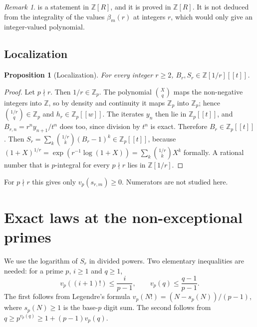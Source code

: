 \documentclass[11pt,reqno]{amsart}
\newtheorem{proposition}[theorem]{Proposition}
\theoremstyle{definition}
\theoremstyle{remark}
\newtheorem{remark}[theorem]{Remark}
\theoremstyle{plain}
\newcommand{\Z}{\mathbb Z}
\begin{document}
\begin{remark}
 is a statement in $\Z[R]$, and it is proved in $\Z[R]$. It is not deduced from the integrality of the values $\beta_m(r)$ at integers $r$, which would only give an integer-valued polynomial.
\end{remark}

\subsection{Localization}

\begin{proposition}[Localization]\label{prop:localization}
For every integer $r\ge2$, $B_r,S_r\in\Z[1/r][[t]]$.
\end{proposition}

\begin{proof}
Let $p\nmid r$. Then $1/r\in\Z_p$. The polynomial $\binom Xq$ maps the non-negative integers into $\Z$, so by density and continuity it maps $\Z_p$ into $\Z_p$; hence $\binom{1/r}q\in\Z_p$ and $h_r\in\Z_p[[w]]$. The iterates $y_n$ then lie in $\Z_p[[t]]$, and $B_{r,n}=r^ny_{n+1}/t^n$ does too, since division by $t^n$ is exact. Therefore $B_r\in\Z_p[[t]]$. Then $S_r=\sum_k\binom{1/r}{k}(B_r-1)^k\in\Z_p[[t]]$, because $(1+X)^{1/r}=\exp(r^{-1}\log(1+X))=\sum_k\binom{1/r}kX^k$ formally. A rational number that is $p$-integral for every $p\nmid r$ lies in $\Z[1/r]$.
\end{proof}

For $p\nmid r$ this gives only $v_p(s_{r,m})\ge0$. Numerators are not studied here.

\section{Exact laws at the non-exceptional primes}\label{sec:nonexc}

We use the logarithm of $S_r$ in divided powers. Two elementary inequalities are needed: for a prime $p$, $i\ge1$ and $q\ge1$,
\begin{equation}\label{eq:legendre}
v_p((i+1)!)\le\frac{i}{p-1},\qquad v_p(q)\le\frac{q-1}{p-1}.
\end{equation}
The first follows from Legendre's formula $v_p(N!)=(N-s_p(N))/(p-1)$, where $s_p(N)\ge1$ is the base-$p$ digit sum. The second follows from $q\ge p^{v_p(q)}\ge1+(p-1)v_p(q)$.
\end{document}
